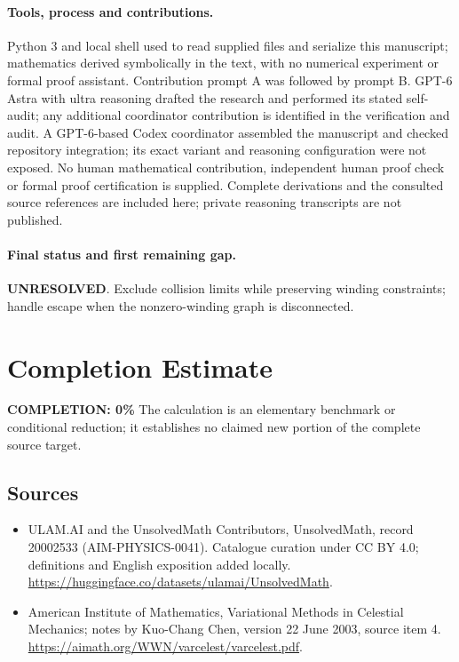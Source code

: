 \documentclass[11pt]{article}
\begin{document}
\paragraph{Tools, process and contributions.}
Python 3 and local shell used to read supplied files and serialize this manuscript; mathematics derived symbolically in the text, with no numerical experiment or formal proof assistant. Contribution prompt A was followed by prompt B. GPT-6 Astra with ultra reasoning drafted the research and performed its stated self-audit; any additional coordinator contribution is identified in the verification and audit. A GPT-6-based Codex coordinator assembled the manuscript and checked repository integration; its exact variant and reasoning configuration were not exposed. No human mathematical contribution, independent human proof check or formal proof certification is supplied. Complete derivations and the consulted source references are included here; private reasoning transcripts are not published.

\paragraph{Final status and first remaining gap.}
\textbf{UNRESOLVED}. Exclude collision limits while preserving winding constraints; handle escape when the nonzero-winding graph is disconnected.

\section{Completion Estimate}
\noindent\textbf{COMPLETION: 0\%}
The calculation is an elementary benchmark or conditional reduction; it establishes no claimed new portion of the complete source target.

\subsection{Sources}
\begin{itemize}
\item[\hypertarget{source:20002533:1}{S1}] ULAM.AI and the UnsolvedMath Contributors, UnsolvedMath, record 20002533 (AIM-PHYSICS-0041). Catalogue curation under CC BY 4.0; definitions and English exposition added locally.
\url{https://huggingface.co/datasets/ulamai/UnsolvedMath}.
\item[\hypertarget{source:20002533:2}{S2}] American Institute of Mathematics, Variational Methods in Celestial Mechanics; notes by Kuo-Chang Chen, version 22 June 2003, source item 4.
\url{https://aimath.org/WWN/varcelest/varcelest.pdf}.
\end{itemize}
\label{end:20002533}
\end{document}
